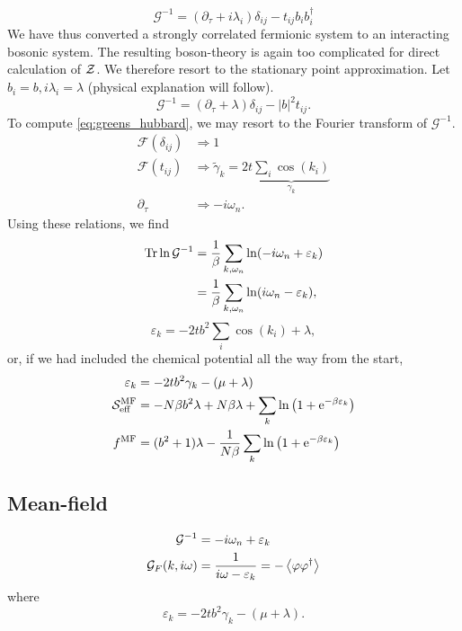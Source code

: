 \begin{equation}
\mathcal{G}^{-1} = \left(\partial_\tau + i\lambda_i\right)\delta_{ij}-t_{ij}b_ib_i^\dagger
\end{equation}
We have thus converted a strongly correlated fermionic system to an interacting bosonic system. 
The resulting boson-theory is again too complicated for direct calculation of $\mathcal{Z}$. We therefore resort to the stationary point approximation.  Let $b_i = b, i\lambda_i = \lambda$ (physical explanation will follow).
\begin{equation}
\label{eq:greens_hubbard}
\mathcal{G}^{-1} = (\partial_\tau + \lambda)\delta_{ij}- |b|^2t_{ij}.
\end{equation}
To compute \eqref{eq:greens_hubbard}, we may resort to the Fourier transform of  $\mathcal{G}^{-1}$.
\begin{align*}
\mathcal{F}(\delta_{ij}) &\Rightarrow 1 \\
\mathcal{F}(t_{ij}) &\Rightarrow \tilde{\gamma}_k = 2t\underbrace{\sum_{i}\cos(k_i)}_{\gamma_k} \\
\partial_\tau &\Rightarrow -i\omega_n.
\end{align*}
Using these relations, we find 
\begin{align}
\Tr\ln\mathcal{G}^{-1} &= \frac{1}{\beta}\sum_{k,\omega_n}\ln(-i\omega_n + \varepsilon_k) \\
&= \frac{1}{\beta}\sum_{k,\omega_n}\ln(i\omega_n - \varepsilon_k),
\end{align}
\begin{equation}
\varepsilon_k = -2tb^2\sum_i\cos(k_i) + \lambda,
\end{equation}
or, if we had included the chemical potential all the way from the start,
\begin{align*}
\varepsilon_k &= -2tb^2\gamma_k-(\mu+\lambda) \\
\mathcal{S}_{\text{eff}}^{\text{MF}} &= -N\beta b^2 \lambda + N\beta \lambda+\sum_k\ln\left(1+\mathrm{e}^{-\beta \varepsilon_k}\right) \\
f^{\text{MF}} &= (b^2 + 1)\lambda - \frac{1}{N\beta}\sum_k\ln\left(1+\mathrm{e}^{-\beta\varepsilon_k}\right)
\end{align*}

\subsection{Mean-field}

\begin{align}
\mathcal{G}^{-1} &= -i\omega_n+\varepsilon_k \\
\mathcal{G}_F(k ,i\omega) &= \frac{1}{i\omega - \varepsilon_k} = -\ev{\varphi\varphi^\dagger}
\end{align}
where 
\begin{equation}
\varepsilon_k = -2tb^2\gamma_k-(\mu+\lambda).
\end{equation}

